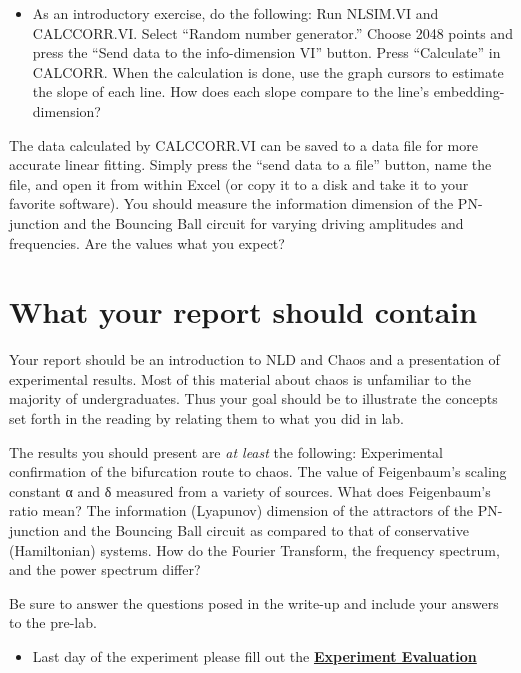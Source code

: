 \documentclass{../lab}
\begin{document}
\begin{itemize}
    \item As an introductory exercise, do the following: Run NLSIM.VI and CALCCORR.VI. Select ``Random number generator.'' Choose 2048 points and press the ``Send data to the info-dimension VI'' button. Press ``Calculate'' in CALCORR. When the calculation is done, use the graph cursors to estimate the slope of each line. How does each slope compare to the line's embedding-dimension?

\end{itemize}

The data calculated by CALCCORR.VI can be saved to a data file for more accurate linear fitting. Simply press the ``send data to a file'' button, name the file, and open it from within Excel (or copy it to a disk and take it to your favorite software). You should measure the information dimension of the PN-junction and the Bouncing Ball circuit for varying driving amplitudes and frequencies. Are the values what you expect?

\section{What your report should contain}

Your report should be an introduction to NLD and Chaos and a presentation of experimental results. Most of this material about chaos is unfamiliar to the majority of undergraduates. Thus your goal should be to illustrate the concepts set forth in the reading by relating them to what you did in lab.

The results you should present are \emph{at least} the following: Experimental confirmation of the bifurcation route to chaos. The value of Feigenbaum's scaling constant α and δ measured from a variety of sources. What does Feigenbaum's ratio mean? The information (Lyapunov) dimension of the attractors of the PN-junction and the Bouncing Ball circuit as compared to that of conservative (Hamiltonian) systems. How do the Fourier Transform, the frequency spectrum, and the power spectrum differ?

Be sure to answer the questions posed in the write-up and include your answers to the pre-lab.

\begin{itemize}
    \item Last day of the experiment please fill out the \href{\ExperimentEvaluation}{\textbf{Experiment Evaluation}}

\end{itemize}
\end{document}

